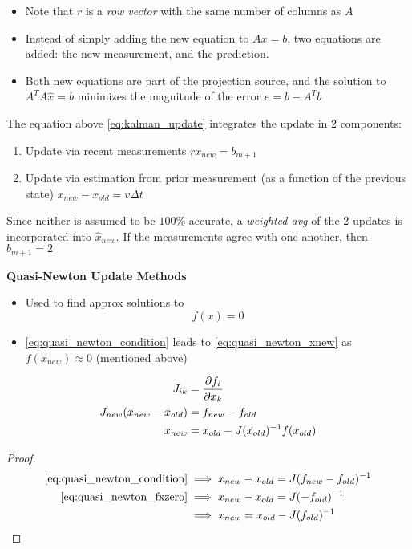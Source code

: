 \documentclass{article}
\begin{document}
\begin{axiom}
  \parbox[m]{10cm}{
    \begin{itemize}
      \item Note that $r$ is a \textit{row vector} with the same number of columns as $A$
      \item Instead of simply adding the new equation to $Ax=b$, two equations are added: the new measurement,
      and the prediction.
      \item Both new equations are part of the projection source, and the solution to $A^TA\hat{x}=b$
      minimizes the magnitude of the error $e=b-A^Tb$ 
    \end{itemize}
    The equation above \eqref{eq:kalman_update} integrates the update in 2 components:
    \begin{enumerate}[nolistsep]
      \item Update via recent measurements $rx_{new}=b_{m+1}$
      \item Update via estimation from prior measurement (as a function of the previous state) $x_{new}-x_{old}=v\Delta t$
    \end{enumerate}
    Since neither is assumed to be $100\%$ accurate, a \textit{weighted avg} of the 2 updates is incorporated into
    $\hat{x}_{new}$.  If the measurements agree with one another, then $b_{m+1}=2$
  }
\end{axiom}

\begin{axiom}
  \textbf{Quasi-Newton Update Methods}\\
  \begin{itemize}
    \item Used to find approx solutions to \begin{equation}\label{eq:quasi_newton_fxzero}f(x)=0\end{equation}
    \item \eqref{eq:quasi_newton_condition} leads to \eqref{eq:quasi_newton_xnew} as $f(x_{new})\approx 0$ (mentioned above)
  \end{itemize}
  \begin{align}
    J_{ik}&={\partial{f_i}\over\partial{x_k}}\\
    \label{eq:quasi_newton_condition}
    J_{new}(x_{new}-x_{old})&=f_{new}-f_{old}\\
    \label{eq:quasi_newton_xnew}
    x_{new}&=x_{old}-J(x_{old})^{-1}f(x_{old})
  \end{align}
  \begin{proof}
    \begin{align*}
      \eqref{eq:quasi_newton_condition}&\implies x_{new}-x_{old}=J(f_{new}-f_{old})^{-1}\\
      \eqref{eq:quasi_newton_fxzero}&\implies x_{new}-x_{old}=J(-f_{old})^{-1}\\
      &\implies x_{new}=x_{old}-J(f_{old})^{-1}
    \end{align*}
  \end{proof}
\end{axiom}
\end{document}
